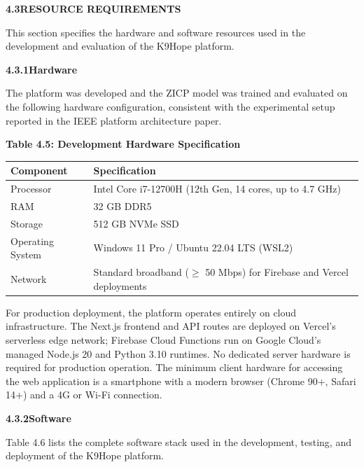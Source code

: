 \documentclass[12pt,a4paper]{article}
\begin{document}
\vspace{2em}
\noindent\textbf{4.3\quad RESOURCE REQUIREMENTS}
\vspace{0.8em}

\noindent This section specifies the hardware and software resources used in the development and evaluation of the K9Hope platform.

\vspace{1.2em}
\noindent\textbf{4.3.1\quad Hardware}
\vspace{0.5em}

\noindent The platform was developed and the ZICP model was trained and evaluated on the following hardware configuration, consistent with the experimental setup reported in the IEEE platform architecture paper.

\begin{center}
\textbf{Table 4.5: Development Hardware Specification}
\vspace{0.4em}
\begin{tabular}{ll}
\toprule
\textbf{Component} & \textbf{Specification} \\
\midrule
Processor & Intel Core i7-12700H (12th Gen, 14 cores, up to 4.7 GHz) \\
RAM & 32 GB DDR5 \\
Storage & 512 GB NVMe SSD \\
Operating System & Windows 11 Pro / Ubuntu 22.04 LTS (WSL2) \\
Network & Standard broadband ($\geq$ 50 Mbps) for Firebase and Vercel deployments \\
\bottomrule
\end{tabular}
\end{center}

\noindent For production deployment, the platform operates entirely on cloud infrastructure. The Next.js frontend and API routes are deployed on Vercel's serverless edge network; Firebase Cloud Functions run on Google Cloud's managed Node.js 20 and Python 3.10 runtimes. No dedicated server hardware is required for production operation. The minimum client hardware for accessing the web application is a smartphone with a modern browser (Chrome 90+, Safari 14+) and a 4G or Wi-Fi connection.

\vspace{1.2em}
\noindent\textbf{4.3.2\quad Software}
\vspace{0.5em}

\noindent Table 4.6 lists the complete software stack used in the development, testing, and deployment of the K9Hope platform.
\end{document}
